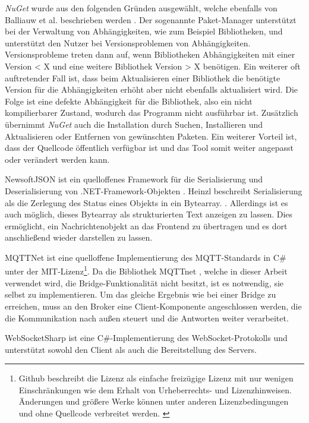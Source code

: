     
    \emph{NuGet} wurde aus den folgenden Gründen ausgewählt, welche ebenfalls von Balliauw et al. beschrieben werden \cite{balliauw2012pro}.
    Der sogenannte Paket-Manager unterstützt bei der Verwaltung von Abhängigkeiten, wie zum Beispiel Bibliotheken, und unterstützt den Nutzer bei Versionsproblemen von Abhängigkeiten. Versionsprobleme treten dann auf, wenn Bibliotheken Abhängigkeiten mit einer Version < X und eine weitere Bibliothek Version > X benötigen. Ein weiterer oft auftretender Fall ist, dass beim Aktualisieren einer Bibliothek die benötigte Version für die Abhängigkeiten erhöht aber nicht ebenfalls aktualisiert wird. Die Folge ist eine defekte Abhängigkeit für die Bibliothek, also ein nicht kompilierbarer Zustand, wodurch das Programm nicht ausführbar ist. Zusätzlich übernimmt \emph{NuGet} auch die Installation durch Suchen, Installieren und Aktualisieren oder Entfernen von gewünschten Paketen. Ein weiterer Vorteil ist, dass der Quellcode öffentlich verfügbar ist und das Tool somit weiter angepasst oder verändert werden kann.
    
    NewsoftJSON ist ein quelloffenes Framework für die Serialisierung und Deserialisierung von .NET-Framework-Objekten \cite{newton_king_2013}.
    Heinzl beschreibt Serialisierung als \glqq[...] die Zerlegung des Status eines Objekts in ein Bytearray.\grqq{} \cite{Heinzl2005}. Allerdings ist es auch möglich, dieses Bytearray als strukturierten Text anzeigen zu lassen.
    Dies ermöglicht, ein Nachrichtenobjekt an das Frontend zu übertragen und es dort anschließend wieder darstellen zu lassen.
    
    MQTTNet ist eine quelloffene Implementierung des \ac{MQTT}-Standards in C\# unter der MIT-Lizenz\footnote{Github beschreibt die Lizenz als einfache freizügige Lizenz mit nur wenigen Einschränkungen wie dem Erhalt von Urheberrechts- und Lizenzhinweisen. Änderungen und größere Werke können unter anderen Lizenzbedingungen und ohne Quellcode verbreitet werden. \cite{github_inc_2019}}.
    Da die Bibliothek MQTTnet \cite{chkr1011_2018}, welche in dieser Arbeit verwendet wird, die Bridge-Funktionalität nicht besitzt, ist es notwendig, sie selbst zu implementieren. Um das gleiche Ergebnis wie bei einer Bridge zu erreichen, muss an den Broker eine Client-Komponente angeschlossen werden, die die Kommunikation nach außen steuert und die Antworten weiter verarbeitet. 
    
    WebSocketSharp ist eine C\#-Implementierung des WebSocket-Protokolls und unterstützt sowohl den Client als auch die Bereitstellung des Servers.
    
